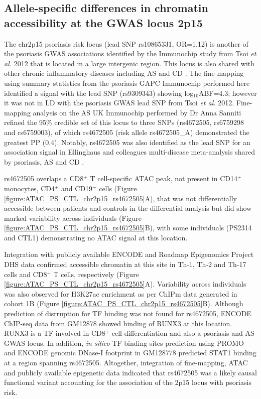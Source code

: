 \subsection{Allele-specific differences in chromatin accessibility at the GWAS locus 2p15}
The chr2p15 psoriasis risk locus (lead SNP rs10865331, OR=1.12) is another of the psoriasis GWAS associations identified by the Immunochip study from Tsoi \textit{et al.} 2012 that is located in a large intergenic region. This locus is also shared with other chronic inflammatory diseases including AS and CD \parencite{Cortes2013,Jostins2012}. The fine-mapping using summary statistics from the psoriasis GAPC Immunochip performed here identified a signal with the lead SNP (rs9309343) showing log$_{10}$ABF=4.3; however it was not in LD with the psoriasis GWAS lead SNP from Tsoi \textit{et al.} 2012. Fine-mapping analysis on the AS UK Immunochip performed by Dr Anna Sanniti refined the 95\% credible set of this locus to three SNPs (rs4672505, rs6759298 and rs6759003), of which rs4672505 (risk allele rs4672505\_A) demonstrated the greatest PP (0.4). Notably, rs4672505 was also identified as the lead SNP for an association signal in Ellinghaus and colleagues multi-disease meta-analysis shared by psoriasis, AS and CD \parencite{Ellinghaus2016}.

rs4672505 overlaps a CD8$^+$ T cell-specific ATAC peak, not present in CD14$^+$ monocytes, CD4$^+$ and CD19$^+$ cells (Figure \ref{figure:ATAC_PS_CTL_chr2p15_rs4672505}A), that was not differentially accessible between patients and controls in the differential analysis but did show marked variability across individuals (Figure \ref{figure:ATAC_PS_CTL_chr2p15_rs4672505}B), with some individuals (PS2314 and CTL1) demonstrating no ATAC signal at this location. 

Integration with publicly available ENCODE and Roadmap Epigenomics Project DHS data confirmed accessible chromatin at this site in Th-1, Th-2 and Th-17 cells and CD8$^+$ T cells, respectively (Figure \ref{figure:ATAC_PS_CTL_chr2p15_rs4672505}A). Variability across individuals was also observed for H3K27ac enrichment as per ChIPm data generated in cohort 1B (Figure \ref{figure:ATAC_PS_CTL_chr2p15_rs4672505}B). Although prediction of disrruption for TF binding was not found for rs4672505,  ENCODE ChIP-seq data from GM12878 showed binding of RUNX3 at this location. RUNX3 is a TF involved in CD8$^+$ cell differentiation \parencite{Wong2011} and also a psoriasis and AS GWAS locus. In addition, \textit{in silico} TF binding sites prediction using PROMO \parencite{Messeguer2002} and ENCODE genomic DNase-I footprint in GM128778 predicted STAT1 binding at a region spanning rs4672505. Altogether, integration of fine-mapping, ATAC and publicly available epigenetic data indicated that rs4672505 was a likely causal functional variant accounting for the association of the 2p15 locus with psoriasis risk.


